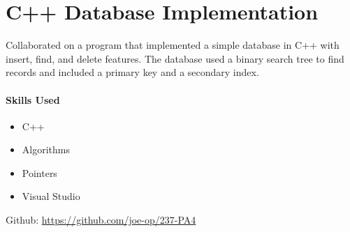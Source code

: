 \documentclass[12pt]{article}
\makeatletter
\newcommand\sectionsubtitle[1]{\def\@sectionsubtitle{#1}}
\makeatother
\begin{document}
\sectionsubtitle{Data Structures and Algorithms, University of Wisconsin-River Falls}
\section*{C++ Database Implementation}
\thispagestyle{plain}

Collaborated on a program that implemented a simple database in C++ with insert, find, and delete features.  The database used a binary search tree to find records and included a primary key and a secondary index.

\paragraph{Skills Used}
\begin{itemize}
\item C++
\item Algorithms
\item Pointers
\item Visual Studio
\end{itemize}


\vspace{\baselineskip}
Github: \url{https://github.com/joe-op/237-PA4}
\vspace{20pt}
\end{document}
